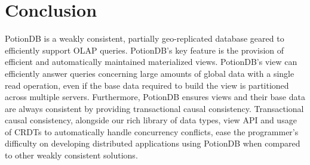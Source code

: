 \documentclass{vldb}
\begin{document}
% 
%

\section{Conclusion}
\label{sec:conclusion}

PotionDB is a weakly consistent, partially geo-replicated database geared to efficiently support OLAP queries.
PotionDB’s key feature is the provision of efficient and automatically maintained materialized views.
PotionDB’s view can efficiently answer queries concerning large amounts of global data with a single read operation, even if the base data required to build the view is partitioned across multiple servers.
Furthermore, PotionDB ensures views and their base data are always consistent by providing transactional causal consistency.
Transactional causal consistency, alongside our rich library of data types, view API and usage of CRDTs to automatically handle concurrency conflicts, ease the programmer’s difficulty on developing distributed applications using PotionDB when compared to other weakly consistent solutions.
\end{document}
